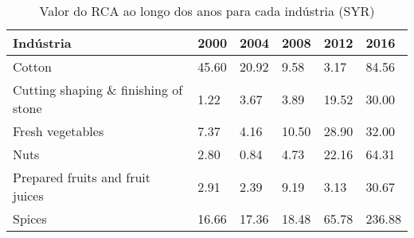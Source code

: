 \begin{table}
\centering
\caption{Valor do RCA ao longo dos anos para cada indústria (SYR)}
\label{tab:ex3-tempo-SYR}
\begin{tabular}{p{6cm}p{1.5cm}p{1.5cm}p{1.5cm}p{1.5cm}p{1.5cm}}
\toprule
                           Indústria &  2000 &  2004 &  2008 &  2012 &   2016 \\
\midrule
                              Cotton & 45.60 & 20.92 &  9.58 &  3.17 &  84.56 \\
Cutting shaping \& finishing of stone &  1.22 &  3.67 &  3.89 & 19.52 &  30.00 \\
                    Fresh vegetables &  7.37 &  4.16 & 10.50 & 28.90 &  32.00 \\
                                Nuts &  2.80 &  0.84 &  4.73 & 22.16 &  64.31 \\
    Prepared fruits and fruit juices &  2.91 &  2.39 &  9.19 &  3.13 &  30.67 \\
                              Spices & 16.66 & 17.36 & 18.48 & 65.78 & 236.88 \\
\bottomrule
\end{tabular}
\end{table}

